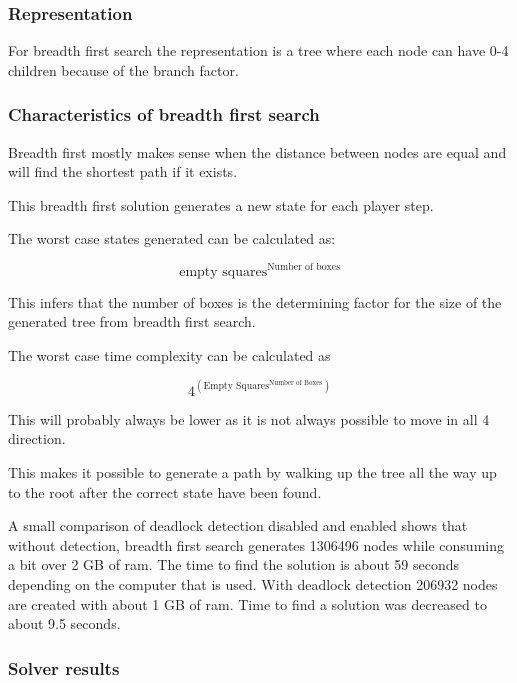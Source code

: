 \documentclass[../../main.tex]{subfiles}
\begin{document}
\subsubsection{Representation}

For breadth first search the representation is a tree where each node can have 0-4 children because of the branch factor.

\subsubsection{Characteristics of breadth first search}

Breadth first mostly makes sense when the distance between nodes are equal and
will find the shortest path if it exists.

This breadth first solution generates a new state for each player step.

The worst case states generated can be calculated as:

\begin{equation}
	\textrm{empty squares}^{ \textrm{Number of boxes}}
\end{equation}

This infers that the number of boxes is the determining factor for the size
of the generated tree from breadth first search.

The worst case time complexity can be calculated as

\begin{equation}
	4^{  \left(  \textrm{Empty Squares} ^{ \textrm{Number of Boxes}}  \right)   }
\end{equation}

This will probably always be lower as it is not always possible to move in all 4 direction.

This makes it possible to generate a path by walking up the tree all the way up to the root after the correct state have 	been found.

A small comparison of deadlock detection disabled and enabled shows that without detection, breadth first search generates 1306496 nodes while consuming a bit over 2 GB of ram. The time to find the solution is about 59 seconds depending on the computer that is used.
With deadlock detection 206932 nodes are created with about 1 GB of ram. Time to find a solution was decreased to about 9.5 seconds.

\subsubsection{Solver results}
\end{document}
